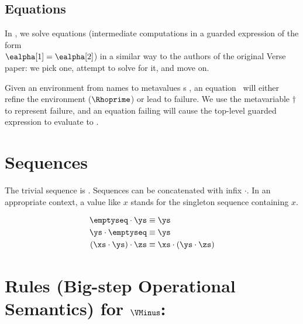 \documentclass[]{article}
\begin{document}
    
    \bigskip
\subsection{Equations}

In \VMinus, we solve equations (intermediate computations in a guarded
expression of the form \\$\ealpha[1] = \ealpha[2]$) in a similar way to the
authors of the original Verse paper: we pick one, attempt to solve for it, and
move on. 


Given an environment from names to metavalues {\valpha}s \Rho, an equation \eq
~will either refine the environment ($\Rhoprime$) or lead to failure. We use
the metavariable $\dagger$ to represent failure, and an equation failing will
cause the top-level guarded expression to evaluate to \reject. 

{}\eqfail
    
    
    \section{Sequences}
    
    The trivial sequence is \emptyseq. Sequences can be concatenated with infix 
$\cdot$. In an appropriate context, a value like $x$ stands for 
the singleton sequence containing $x$. 

\begin{align*}
    \emptyseq \cdot \ys &\equiv \ys \\
    \ys \cdot \emptyseq &\equiv \ys \\
    (\xs \cdot \ys) \cdot \zs &\equiv \xs \cdot (\ys \cdot \zs)
\end{align*}

\section{Rules (Big-step Operational Semantics) for $\VMinus$:}
    
\end{document}
